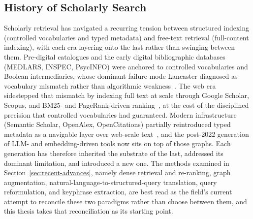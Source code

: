 \subsection{History of Scholarly Search}
\label{sec:history}

Scholarly retrieval has navigated a recurring tension between structured
indexing (controlled vocabularies and typed metadata) and free-text retrieval
(full-content indexing), with each era layering onto the last rather than
swinging between them. Pre-digital catalogues and the early digital
bibliographic databases (MEDLARS, INSPEC, PsycINFO) were anchored to
controlled vocabularies and Boolean intermediaries, whose dominant failure
mode Lancaster diagnosed as vocabulary mismatch rather than algorithmic
weakness~\cite{lancaster1969medlars}. The web era sidestepped that mismatch by
indexing full text at scale through Google Scholar, Scopus, and BM25- and
PageRank-driven
ranking~\cite{robertson1994bm25,brin1998pagerank,falagas2008comparison}, at
the cost of the disciplined precision that controlled vocabularies had
guaranteed. Modern infrastructure (Semantic Scholar, OpenAlex,
OpenCitations) partially reintroduced typed metadata as a navigable layer over
web-scale
text~\cite{ammar2018construction,priem2022openalex,peroni2020opencitations},
and the post-2022 generation of LLM- and embedding-driven tools now sits on
top of those graphs. Each generation has therefore inherited the substrate
of the last, addressed its dominant limitation, and introduced a new one. The
methods examined in Section~\ref{sec:recent-advances}, namely dense
retrieval and re-ranking, graph augmentation,
natural-language-to-structured-query translation, query reformulation,
and keyphrase extraction, are best read as the field's current
attempt to reconcile these two paradigms rather than choose between them,
and this thesis takes that reconciliation as its starting point.